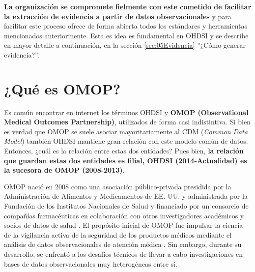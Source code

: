 \begin{itemize}
    \textbf{La organización se compromete fielmente con este cometido de facilitar la extracción de evidencia a partir de datos observacionales} y para facilitar este proceso ofrece de forma abierta todos los estándares y herramientas mencionados anteriormente. Esta es idea es fundamental en OHDSI y se describe en mayor detalle a continuación, en la sección \ref{sec:05Evidencia} ''¿Cómo generar evidencia?''.

\end{itemize}


\section{¿Qué es OMOP?} \label{sec:05omop}

Es común encontrar en internet los términos OHDSI y \textbf{OMOP (Observational Medical Outcomes Partnership)}, utilizados de forma casi indistintiva. Si bien es verdad que OMOP se suele asociar mayoritariamente al CDM (\textit{Common Data Model}) también OHDSI mantiene gran relación con este modelo común de datos. Entonces, ¿cuál es la relación entre estas dos entidades? Pues bien, \textbf{la relación que guardan estas dos entidades es filial, OHDSI (2014-Actualidad) es la sucesora de OMOP (2008-2013)}.

OMOP nació en 2008 como una asociación público-privada presidida por la Administración de Alimentos y Medicamentos de EE. UU. y administrada por la Fundación de los Institutos Nacionales de Salud y financiado por un consorcio de compañías farmacéuticas en colaboración con otros investigadores académicos y socios de datos de salud \cite{stang2010advancing}. El propósito inicial de OMOP fue impulsar la ciencia de la vigilancia activa de la seguridad de los productos médicos mediante el análisis de datos observacionales de atención médica \cite{stang2010advancing}. Sin embargo, durante su desarrollo, se enfrentó a los desafíos técnicos de llevar a cabo investigaciones en bases de datos observacionales muy heterogéneas entre sí.

